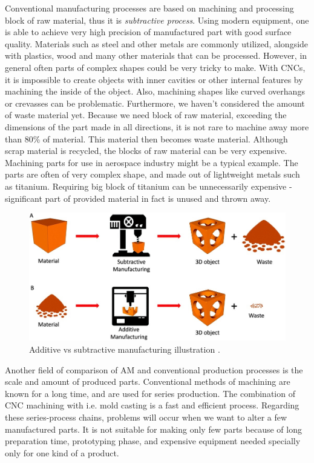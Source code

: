 \documentclass[a4paper, twoside, 11pt]{report}
\begin{document}
	Conventional manufacturing processes are based on machining and processing block of raw material, thus it is \textit{subtractive process}. Using modern equipment, one is able to achieve very high precision of manufactured part with good surface quality. Materials such as steel and other metals are commonly utilized, alongside with plastics, wood and many other materials that can be processed. However, in general often parts of complex shapes could be very tricky to make. With CNCs, it is impossible to create objects with inner cavities or other internal features by machining the inside of the object. Also, machining shapes like curved overhangs or crevasses can be problematic. Furthermore, we haven’t considered the amount of waste material yet. Because we need block of raw material, exceeding the dimensions of the part made in all directions, it is not rare to machine away more than 80\% of material. This material then becomes waste material. Although scrap material is recycled, the blocks of raw material can be very expensive. Machining parts for use in aerospace industry might be a typical example. The parts are often of very complex shape, and made out of lightweight metals such as titanium. Requiring big block of titanium can be unnecessarily expensive - significant part of provided material in fact is unused and thrown away.
\begin{figure}[b!]
\centering
\includegraphics[scale=0.6]{additiveSubtractiveManufacturing}
\caption{Additive vs subtractive manufacturing illustration \cite{AdditiveSubtractive}.}
\end{figure}

	Another field of comparison of AM and conventional production processes is the scale and amount of produced parts. Conventional methods of machining are known for a long time, and are used for series production. The combination of CNC machining with i.e. mold casting is a fast and efficient process. Regarding these series-process chains, problems will occur when we want to alter a few manufactured parts. It is not suitable for making only few parts because of long preparation time, prototyping phase, and expensive equipment needed specially only for one kind of a product.
\end{document}
